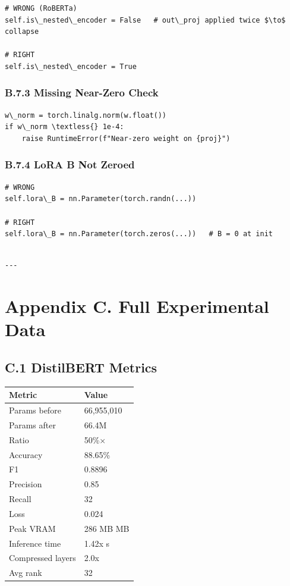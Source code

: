 \begin{lstlisting}
# WRONG (RoBERTa)
self.is\_nested\_encoder = False   # out\_proj applied twice $\to$ collapse

# RIGHT
self.is\_nested\_encoder = True
\end{lstlisting}

\subsubsection{B.7.3 Missing Near-Zero Check}

\begin{lstlisting}
w\_norm = torch.linalg.norm(w.float())
if w\_norm \textless{} 1e-4:
    raise RuntimeError(f"Near-zero weight on {proj}")
\end{lstlisting}

\subsubsection{B.7.4 LoRA B Not Zeroed}

\begin{lstlisting}
# WRONG
self.lora\_B = nn.Parameter(torch.randn(...))

# RIGHT
self.lora\_B = nn.Parameter(torch.zeros(...))   # B = 0 at init
\end{lstlisting}
\begin{lstlisting}

---
\end{lstlisting}


\section{Appendix C. Full Experimental Data}

\subsection{C.1 DistilBERT Metrics}

\begin{table}[H]
\centering
\small
\begin{tabular}{ll}
\toprule
\textbf{Metric} & \textbf{Value} \\
\midrule
Params before & 66,955,010 \\
Params after & 66.4M \\
Ratio & 50\%$\times$ \\
Accuracy & 88.65\% \\
F1 & 0.8896 \\
Precision & 0.85 \\
Recall & 32 \\
Loss & 0.024 \\
Peak VRAM & 286 MB MB \\
Inference time & 1.42x s \\
Compressed layers & 2.0x \\
Avg rank & 32 \\
\bottomrule
\end{tabular}
\end{table}

